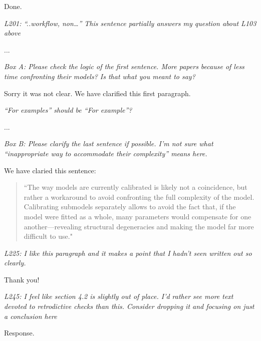 \documentclass[11pt,letter]{article}
\begin{document}
Done.

\begin{mybox}
\emph{L201: “..workflow, non…” This sentence partially answers my question about L103 above}
\end{mybox}

...

\begin{mybox}
\emph{Box A: Please check the logic of the first sentence. More papers because of less time confronting their models? Is that what you meant to say?}
\end{mybox} 

Sorry it was not clear. We have clarified this first paragraph.

\begin{mybox}
\emph{“For examples” should be “For example”?}
\end{mybox} 

...

\begin{mybox}
\emph{Box B: Please clarify the last sentence if possible. I’m not sure what “inappropriate way to accommodate their complexity” means here.}
\end{mybox}

We have claried this sentence:
\begin{quote}
``The way models are currently calibrated is likely not a coincidence, but rather a workaround to avoid confronting the full complexity of the model. Calibrating submodels separately allows to avoid the fact that, if the model were fitted as a whole, many parameters would compensate for one another---revealing structural degeneracies and making the model far more difficult to use."
\end{quote}

\begin{mybox}
\emph{L225: I like this paragraph and it makes a point that I hadn’t seen written out so clearly.}
\end{mybox}

Thank you!

\begin{mybox}
\emph{L245: I feel like section 4.2 is slightly out of place. I’d rather see more text devoted to retrodictive checks than this. Consider dropping it and focusing on just a conclusion here}
\end{mybox}

Response. %
\end{document}

